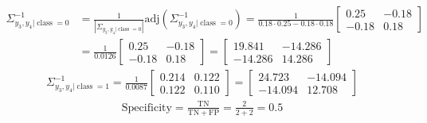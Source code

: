 \documentclass{article}
\DeclareMathOperator*{\class}{class}
\begin{document}
    \begin{align*}
        \Sigma_{y_3, y_4|\class = 0}^{-1} &= \frac{1}{|\Sigma_{y_3, y_4|\class = 0}|}\mathrm{adj}\left({\Sigma_{y_3, y_4|\class = 0}^{-1}}\right) = \frac{1}{0.18 \cdot 0.25 - 0.18 \cdot 0.18} 
        \begin{bmatrix}
            0.25 & -0.18 \\
            -0.18 & 0.18
        \end{bmatrix} \\ &= \frac{1}{0.0126} 
        \begin{bmatrix}
            0.25 & -0.18 \\
            -0.18 & 0.18
        \end{bmatrix} =
        \begin{bmatrix}
            19.841 & -14.286 \\
            -14.286 & 14.286 
        \end{bmatrix}
    \end{align*}
    \begin{align*}
        \Sigma_{y_3, y_4|\class = 1}^{-1} = \frac{1}{0.0087} 
        \begin{bmatrix}
            0.214 & 0.122 \\
            0.122 & 0.110
        \end{bmatrix} = 
        \begin{bmatrix}
            24.723 & -14.094 \\
            -14.094 & 12.708 
        \end{bmatrix}
    \end{align*}
    \begin{align*}
        \mathrm{Specificity} = \frac{\mathrm{TN}}{\mathrm{TN} + \mathrm{FP}} = \frac{2}{2 + 2} = 0.5
    \end{align*}
\end{document}
